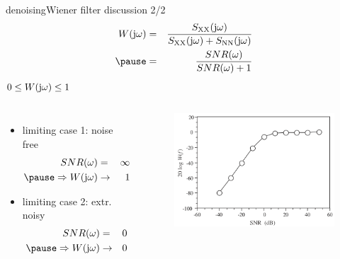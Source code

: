 	\begin{frame}{denoising}{Wiener filter discussion 2/2}
      \vspace{-5mm} \begin{eqnarray*}
            W(\jom) &=& \frac{S_\mathrm{XX}(\jom)}{{S}_\mathrm{XX}(\jom) + {S}_\mathrm{NN}(\jom)}\\
            \pause
            &=& \frac{SNR(\omega)}{SNR(\omega) + 1}
        \end{eqnarray*}
        \smallskip
        $0\leq W(\mathrm{j}\omega)\leq 1$
        
        \vspace{-3mm}
        \begin{columns}
        \begin{itemize}
            \item   limiting case 1: noise free
                \begin{eqnarray*}
                    SNR(\omega) &=& \infty\\
                    \pause
                    \Rightarrow  
                    W(\jom) &\rightarrow & 1
                \end{eqnarray*}
            \item   limiting case 2: extr. noisy
                \begin{eqnarray*}
                    SNR(\omega) &=& 0\\
                    \pause
                    \Rightarrow  
                    W(\jom) &\rightarrow & 0
                \end{eqnarray*}
        \end{itemize}
        \begin{figure}
            \includegraphics[scale=.3]{graph/WienerSNR}
        \end{figure}
        \end{columns}
 	\end{frame}

